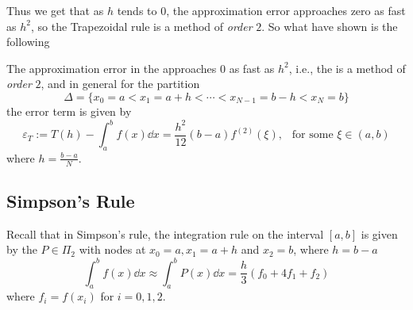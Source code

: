 Thus we get that as $h$ tends to $0$, the approximation error approaches zero as fast as $h^2$, so the Trapezoidal rule is a method of \textit{order} $2$. So what have shown is the following 
\begin{thm}\label{thm1:apr4A}
    The approximation error in the  approaches $0$ as fast as $h^2$, i.e., the  is a method of \textit{order} $2$, and in general for the partition 
    \[
        \Delta = \{ x_0 = a < x_1 = a+h < \cdots < x_{N-1} = b-h < x_N = b \}    
    \]
    the error term is given by 
    \[
        \varepsilon_T := T(h) - \int_a^b f(x) \dd{x} = \frac{h^2}{12}(b-a) f^{(2)}(\xi), \ \ \mbox{ for some } \xi \in (a,b)  
    \]
    where $h = \frac{b-a}{N}$.
\end{thm}

\subsection{Simpson's Rule}

Recall that in Simpson's rule, the integration rule on the interval $[a,b]$ is given by the  $P \in \Pi_2$ with nodes at $x_0 = a, x_1 = a+h$ and $x_2 = b$, where $h = b-a$
\[
    \int_a^b f(x) \dd{x} \approx \int_a^b P(x) \dd{x} = \frac{h}{3}(f_0 + 4f_1 + f_2)    
\]
where $f_i = f(x_i)$ for $i = 0,1,2$. 

\ 


